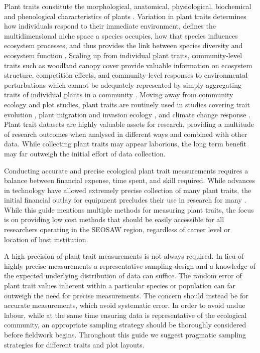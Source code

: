 \documentclass[11pt,a4paper]{article}
\begin{document}
Plant traits constitute the morphological, anatomical, physiological, biochemical and phenological characteristics of plants \citep{TRY}. Variation in plant traits determines how individuals respond to their immediate environment, defines the multidimensional niche space a species occupies, how that species influences ecosystem processes, and thus provides the link between species diversity and ecosystem function \citep{Butler2017, Madani2018}. Scaling up from individual plant traits, community-level traits such as woodland canopy cover provide valuable information on ecosystem structure, competition effects, and community-level responses to environmental perturbations which cannot be adequately represented by simply aggregating traits of individual plants in a community \citep{He2019}. Moving away from community ecology and plot studies, plant traits are routinely used in studies covering trait evolution \citep{Donovan2011}, plant migration and invasion ecology \citep{Drenovsky2012}, and climate change response \citep{Heilmeier2019}. Plant trait datasets are highly valuable assets for research, providing a multitude of research outcomes when analysed in different ways and combined with other data. While collecting plant traits may appear laborious, the long term benefit may far outweigh the initial effort of data collection.

Conducting accurate and precise ecological plant trait measurements requires a balance between financial expense, time spent, and skill required. While advances in technology have allowed extremely precise collection of many plant traits, the initial financial outlay for equipment precludes their use in research for many \citep{Allan2018}. While this guide mentions multiple methods for measuring plant traits, the focus is on providing low cost methods that should be easily accessible for all researchers operating in the SEOSAW region, regardless of career level or location of host institution. 

A high precision of plant trait measurements is not always required. In lieu of highly precise measurements a representative sampling design and a knowledge of the expected underlying distribution of data can suffice. The random error of plant trait values inherent within a particular species or population can far outweigh the need for precise measurements. The concern should instead be for accurate measurements, which avoid systematic error. In order to avoid undue labour, while at the same time ensuring data is representative of the ecological community, an appropriate sampling strategy should be thoroughly considered before fieldwork begins. Throughout this guide we suggest pragmatic sampling strategies for different traits and plot layouts.
\end{document}
